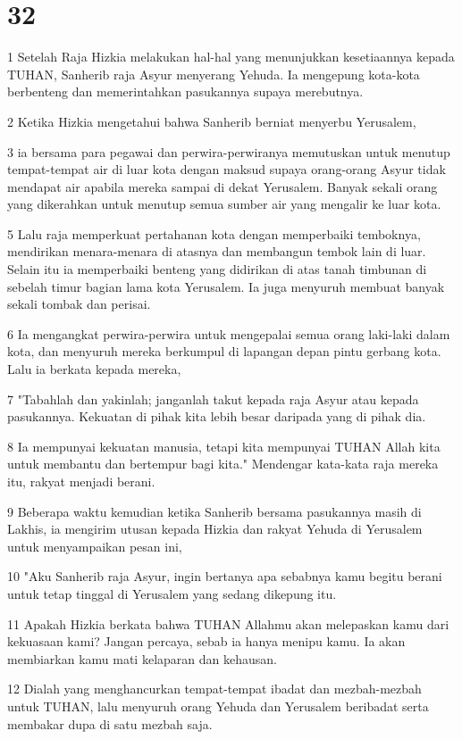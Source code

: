 \chapter{32}

\par 1 Setelah Raja Hizkia melakukan hal-hal yang menunjukkan kesetiaannya kepada TUHAN, Sanherib raja Asyur menyerang Yehuda. Ia mengepung kota-kota berbenteng dan memerintahkan pasukannya supaya merebutnya.
\par 2 Ketika Hizkia mengetahui bahwa Sanherib berniat menyerbu Yerusalem,
\par 3 ia bersama para pegawai dan perwira-perwiranya memutuskan untuk menutup tempat-tempat air di luar kota dengan maksud supaya orang-orang Asyur tidak mendapat air apabila mereka sampai di dekat Yerusalem. Banyak sekali orang yang dikerahkan untuk menutup semua sumber air yang mengalir ke luar kota.
\par 5 Lalu raja memperkuat pertahanan kota dengan memperbaiki temboknya, mendirikan menara-menara di atasnya dan membangun tembok lain di luar. Selain itu ia memperbaiki benteng yang didirikan di atas tanah timbunan di sebelah timur bagian lama kota Yerusalem. Ia juga menyuruh membuat banyak sekali tombak dan perisai.
\par 6 Ia mengangkat perwira-perwira untuk mengepalai semua orang laki-laki dalam kota, dan menyuruh mereka berkumpul di lapangan depan pintu gerbang kota. Lalu ia berkata kepada mereka,
\par 7 "Tabahlah dan yakinlah; janganlah takut kepada raja Asyur atau kepada pasukannya. Kekuatan di pihak kita lebih besar daripada yang di pihak dia.
\par 8 Ia mempunyai kekuatan manusia, tetapi kita mempunyai TUHAN Allah kita untuk membantu dan bertempur bagi kita." Mendengar kata-kata raja mereka itu, rakyat menjadi berani.
\par 9 Beberapa waktu kemudian ketika Sanherib bersama pasukannya masih di Lakhis, ia mengirim utusan kepada Hizkia dan rakyat Yehuda di Yerusalem untuk menyampaikan pesan ini,
\par 10 "Aku Sanherib raja Asyur, ingin bertanya apa sebabnya kamu begitu berani untuk tetap tinggal di Yerusalem yang sedang dikepung itu.
\par 11 Apakah Hizkia berkata bahwa TUHAN Allahmu akan melepaskan kamu dari kekuasaan kami? Jangan percaya, sebab ia hanya menipu kamu. Ia akan membiarkan kamu mati kelaparan dan kehausan.
\par 12 Dialah yang menghancurkan tempat-tempat ibadat dan mezbah-mezbah untuk TUHAN, lalu menyuruh orang Yehuda dan Yerusalem beribadat serta membakar dupa di satu mezbah saja.
